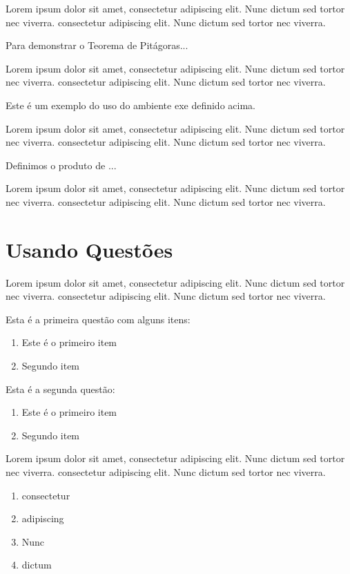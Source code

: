 Lorem ipsum dolor sit amet, consectetur adipiscing elit. Nunc dictum sed tortor nec viverra. consectetur adipiscing elit. Nunc dictum sed tortor nec viverra.

\begin{prop}
	Para demonstrar o Teorema de Pitágoras...
\end{prop}

Lorem ipsum dolor sit amet, consectetur adipiscing elit. Nunc dictum sed tortor nec viverra. consectetur adipiscing elit. Nunc dictum sed tortor nec viverra.

\begin{exem}
	Este é um exemplo do uso do ambiente exe definido acima.
\end{exem}

Lorem ipsum dolor sit amet, consectetur adipiscing elit. Nunc dictum sed tortor nec viverra. consectetur adipiscing elit. Nunc dictum sed tortor nec viverra.

\begin{xdefinicao}
	Definimos o produto de ...
\end{xdefinicao}

Lorem ipsum dolor sit amet, consectetur adipiscing elit. Nunc dictum sed tortor nec viverra. consectetur adipiscing elit. Nunc dictum sed tortor nec viverra.

\section{Usando Questões}


Lorem ipsum dolor sit amet, consectetur adipiscing elit. Nunc dictum sed tortor nec viverra. consectetur adipiscing elit. Nunc dictum sed tortor nec viverra.

\begin{questao}
	\item Esta é a primeira questão com alguns itens:
		\begin{enumerate}
			\item Este é o primeiro item
			\item Segundo item
		\end{enumerate}
	\item Esta é a segunda questão:
		\begin{enumerate}
			\item Este é o primeiro item
			\item Segundo item
		\end{enumerate}
	\item Lorem ipsum dolor sit amet, consectetur adipiscing elit. Nunc dictum sed tortor nec viverra. consectetur adipiscing elit. Nunc dictum sed tortor nec viverra.
		\begin{enumerate}
			\item consectetur
			\item adipiscing
			\item Nunc
			\item dictum
		\end{enumerate}
\end{questao}

